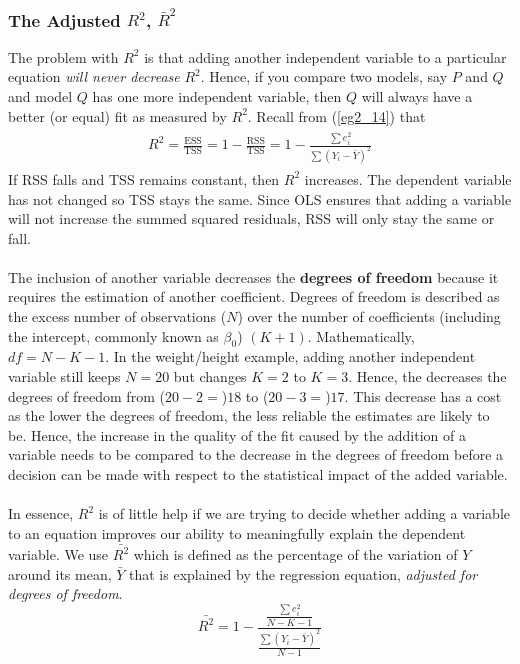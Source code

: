 \documentclass[11pt]{article}
\begin{document}
\subsubsection{The Adjusted $R^2$, $\bar{R}^2$}
The problem with $R^2$ is that adding another independent variable to a particular equation \textit{will never decrease} $R^2$. Hence, if you compare two models, say $P$ and $Q$ and model $Q$ has one more independent variable, then $Q$ will always have a better (or equal) fit as measured by $R^2$. Recall from (\ref{eg2_14}) that
\begin{align*}
\begin{split}
R^2 = \frac{\text{ESS}}{\text{TSS}} 
= 1- \frac{\text{RSS}}{\text{TSS}} 
= 1- \frac{\sum e_i^2}{\sum (Y_i - \bar{Y})^2}
\end{split}
\end{align*}
If RSS falls and TSS remains constant, then $R^2$ increases. The dependent variable has not changed so TSS stays the same. Since OLS ensures that adding a variable will not increase the summed squared residuals, RSS will only stay the same or fall. \\ \\
The inclusion of another variable decreases the \textbf{degrees of freedom} because it requires the estimation of another coefficient. Degrees of freedom is described as the excess number of observations ($N$) over the number of coefficients (including the intercept, commonly known as $\beta_0$) $(K+1)$. Mathematically, $df = N-K-1$. In the weight/height example, adding another independent variable still keeps $N=20$ but changes $K=2$ to $K=3$. Hence, the decreases the degrees of freedom from ($20-2=$)$18$ to ($20-3=$)$17$. This decrease has a cost as the lower the degrees of freedom, the less reliable the estimates are likely to be. Hence, the increase in the quality of the fit caused by the addition of a variable needs to be compared to the decrease in the degrees of freedom before a decision can be made with respect to the statistical impact of the added variable.\\ \\
In essence, $R^2$ is of little help if we are trying to decide whether adding a variable to an equation improves our ability to meaningfully explain the dependent variable. We use $\bar{R^2}$ which is defined as the percentage of the variation of $Y$ around its mean, $\bar{Y}$ that is explained by the regression equation, \textit{adjusted for degrees of freedom}. 
\begin{equation}
\bar{R^2} = 1- 
\frac{
	\frac{\sum e_i^2}{N-K-1}
}{
	\frac{\sum (Y_i-\bar{Y})^2}{N-1}
}
\end{equation}
\clearpage
\end{document}

